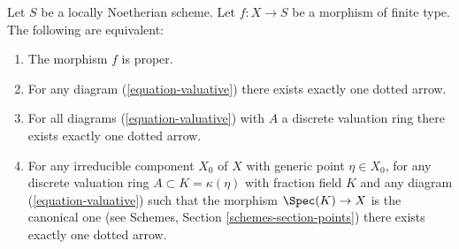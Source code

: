 \begin{lemma}
\label{lemma-Noetherian-dvr-valuative-proper}
Let $S$ be a locally Noetherian scheme.
Let $f : X \to S$ be a morphism of finite type.
The following are equivalent:
\begin{enumerate}
\item The morphism $f$ is proper.
\item For any diagram (\ref{equation-valuative}) there exists exactly
one dotted arrow.
\item For all diagrams (\ref{equation-valuative}) with $A$ a discrete
valuation ring there exists exactly one dotted arrow.
\item For any irreducible component $X_0$ of $X$ with
generic point $\eta \in X_0$, for any discrete valuation ring
$A \subset K = \kappa(\eta)$ with fraction field $K$ and any
diagram (\ref{equation-valuative}) such that
the morphism $\Spec(K) \to X$ is the canonical one
(see
Schemes, Section \ref{schemes-section-points})
there exists exactly one dotted arrow.
\end{enumerate}
\end{lemma}

